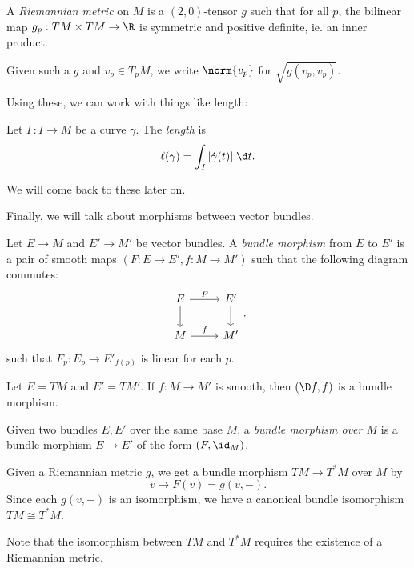 \documentclass[a4paper]{article}
\begin{document}
\begin{defi}
  A \emph{Riemannian metric} on $M$ is a $(2, 0)$-tensor $g$ such that for all $p$, the bilinear map $g_p: T M \times T M \to \R$ is symmetric and positive definite, ie. an inner product.

  Given such a $g$ and $v_p \in T_p M$, we write $\norm{v_p}$ for $\sqrt{g(v_p, v_p)}$.
\end{defi}

Using these, we can work with things like length:

\begin{defi}
  Let $\Gamma: I \to M$ be a curve $\gamma$. The \emph{length} is
  \[
    \ell(\gamma)= \int_I |\dot{\gamma}(t)| \;\d t.
  \]
\end{defi}

We will come back to these later on.

Finally, we will talk about morphisms between vector bundles.

\begin{defi}
  Let $E \to M$ and $E' \to M'$ be vector bundles. A \emph{bundle morphism} from $E$ to $E'$ is a pair of smooth maps $(F: E \to E', f: M \to M')$ such that the following diagram commutes:
  \[
    \begin{tikzcd}
      E \ar[d] \ar[r, "F"] & E' \ar[d]\\
      M \ar[r, "f"] & M'
    \end{tikzcd}.
  \]
  such that $F_p: E_p \to E'_{f(p)}$ is linear for each $p$.
\end{defi}

\begin{eg}
  Let $E = TM$ and $E' = TM'$. If $f: M \to M'$ is smooth, then $(\D f, f)$ is a bundle morphism.
\end{eg}

\begin{defi}
  Given two bundles $E, E'$ over the same base $M$, a \emph{bundle morphism over $M$} is a bundle morphism $E \to E'$ of the form $(F, \id_M)$.
\end{defi}

\begin{eg}
  Given a Riemannian metric $g$, we get a bundle morphism $TM \to T^*M$ over $M$ by
  \[
    v \mapsto F(v) = g(v, -).
  \]
  Since each $g(v, -)$ is an isomorphism, we have a canonical bundle isomorphism $TM \cong T^*M$.
\end{eg}
Note that the isomorphism between $TM$ and $T^*M$ requires the existence of a Riemannian metric.
\end{document}
